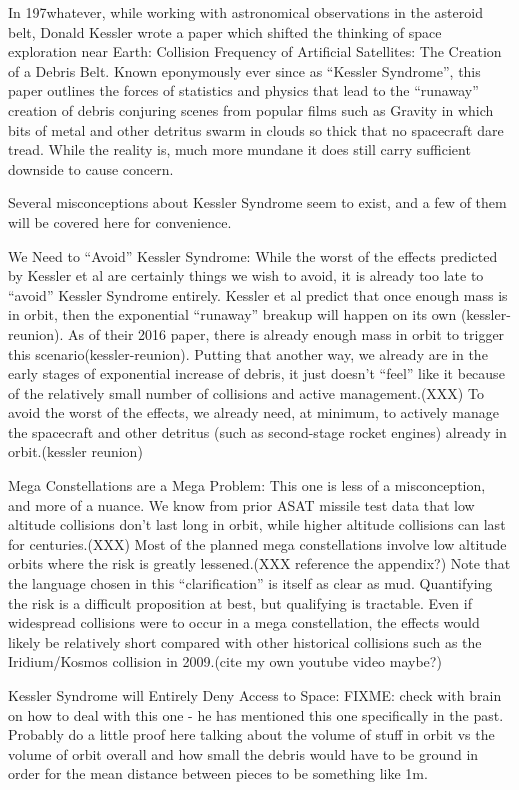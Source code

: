 In 197whatever, while working with astronomical observations in the
asteroid belt, Donald Kessler wrote a paper which shifted the thinking
of space exploration near Earth: Collision Frequency of Artificial
Satellites: The Creation of a Debris Belt.  Known eponymously ever
since as ``Kessler Syndrome'', this paper outlines the forces of
statistics and physics that lead to the ``runaway'' creation of debris
conjuring scenes from popular films such as Gravity in which bits of
metal and other detritus swarm in clouds so thick that no spacecraft
dare tread.  While the reality is, much more mundane it does still
carry sufficient downside to cause concern.

Several misconceptions about Kessler Syndrome seem to exist, and a few
of them will be covered here for convenience.

We Need to ``Avoid'' Kessler Syndrome: While the worst of the effects
predicted by Kessler et al are certainly things we wish to avoid, it
is already too late to ``avoid'' Kessler Syndrome entirely.  Kessler et
al predict that once enough mass is in orbit, then the exponential
``runaway'' breakup will happen on its own (kessler-reunion).  As of
their 2016 paper, there is already enough mass in orbit to trigger
this scenario(kessler-reunion).  Putting that another way, we already
are in the early stages of exponential increase of debris, it just
doesn't ``feel'' like it because of the relatively small number of
collisions and active management.(XXX) To avoid the worst of the
effects, we already need, at minimum, to actively manage the
spacecraft and other detritus (such as second-stage rocket engines)
already in orbit.(kessler reunion)

Mega Constellations are a Mega Problem: This one is less of a
misconception, and more of a nuance.  We know from prior ASAT missile
test data that low altitude collisions don't last long in orbit, while
higher altitude collisions can last for centuries.(XXX) Most of the
planned mega constellations involve low altitude orbits where the risk
is greatly lessened.(XXX reference the appendix?)  Note that the
language chosen in this ``clarification'' is itself as clear as mud.
Quantifying the risk is a difficult proposition at best, but
qualifying is tractable.  Even if widespread collisions were to occur
in a mega constellation, the effects would likely be relatively short
compared with other historical collisions such as the Iridium/Kosmos
collision in 2009.(cite my own youtube video maybe?)

Kessler Syndrome will Entirely Deny Access to Space: FIXME: check with
brain on how to deal with this one - he has mentioned this one
specifically in the past.  Probably do a little proof here talking
about the volume of stuff in orbit vs the volume of orbit overall and
how small the debris would have to be ground in order for the mean
distance between pieces to be something like 1m.

